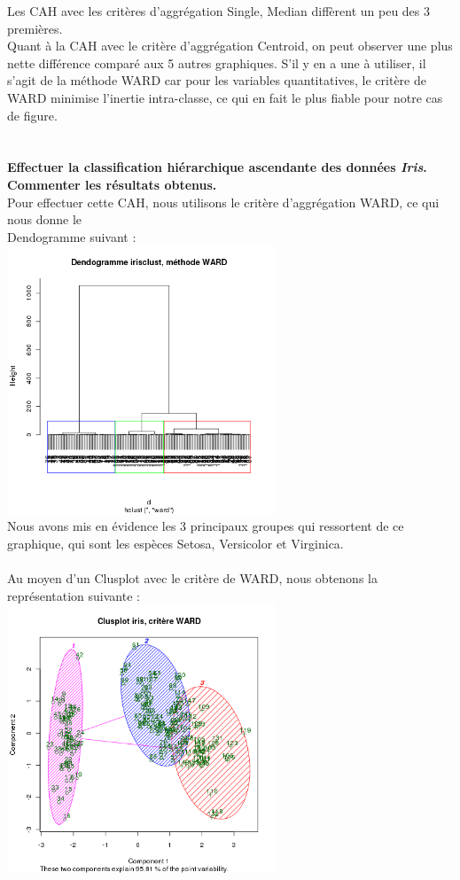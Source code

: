 \documentclass[a4paper, 10pt]{article}
\begin{document}
Les CAH avec les crit\`eres d'aggr\'egation Single, Median diff\`erent un peu des 3 premi\`eres.\\
Quant \`a la CAH avec le crit\`ere d'aggr\'egation Centroid, on peut observer une plus nette diff\'erence compar\'e aux 5 autres graphiques.
S'il y en a une à utiliser, il s'agit de la méthode WARD car pour les variables quantitatives,
le crit\`ere de WARD minimise l'inertie intra-classe, ce qui en fait le plus fiable pour notre cas de figure.\\ \\ \\
\textbf{Effectuer la classification hi\'erarchique ascendante des donn\'ees \textit{Iris}.
Commenter les r\'esultats obtenus.}\\
Pour effectuer cette CAH, nous utilisons le crit\`ere d'aggr\'egation WARD, ce qui nous donne le\\Dendogramme suivant :\\
\includegraphics[height = 8cm, width = 8cm]{plots/plot_ward_2.png}\\
Nous avons mis en \'evidence les 3 principaux groupes qui ressortent de ce graphique, qui sont les esp\`eces Setosa, Versicolor et Virginica.\\ \\
Au moyen d'un Clusplot avec le crit\`ere de WARD, nous obtenons la repr\'esentation suivante :\\
\includegraphics[height = 8cm, width = 8cm]{plots/clusplot_ward_1.png}\\ \\
\end{document}

